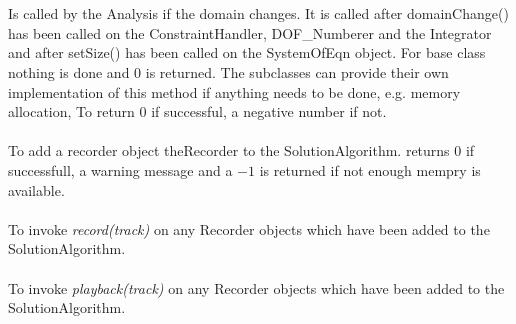   \\
 \\
Is called by the Analysis if the domain changes. It is called after
domainChange() has been called on the ConstraintHandler,
DOF\_Numberer and the Integrator and after setSize() has been
called on the SystemOfEqn object. For base class nothing is done and
$0$ is returned. The subclasses can provide their own implementation
of this method if anything needs to be done, e.g. memory allocation,
To return $0$ if successful, a negative number if not. \\


\\
To add a recorder object \p theRecorder to the
SolutionAlgorithm. returns $0$ if successfull, a warning message and a
$-1$ is returned if not enough mempry is available. \\

 \\
To invoke {\em record(track)} on any Recorder objects which have been added to the
SolutionAlgorithm. \\

 \\
To invoke {\em playback(track)} on any Recorder objects which have been added to the
SolutionAlgorithm. \\






